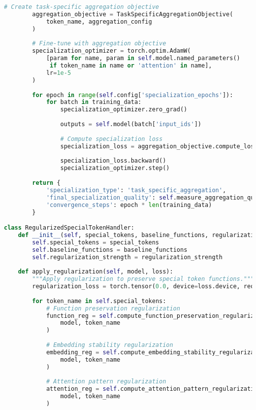 \begin{lstlisting}[language=Python, caption=Function-preserving fine-tuning framework]
        # Create task-specific aggregation objective
        aggregation_objective = TaskSpecificAggregationObjective(
            token_name, aggregation_config
        )
        
        # Fine-tune with aggregation objective
        specialization_optimizer = torch.optim.AdamW(
            [param for name, param in self.model.named_parameters() 
             if token_name in name or 'attention' in name],
            lr=1e-5
        )
        
        for epoch in range(self.config['specialization_epochs']):
            for batch in training_data:
                specialization_optimizer.zero_grad()
                
                outputs = self.model(batch['input_ids'])
                
                # Compute specialization loss
                specialization_loss = aggregation_objective.compute_loss(outputs, batch)
                
                specialization_loss.backward()
                specialization_optimizer.step()
        
        return {
            'specialization_type': 'task_specific_aggregation',
            'final_specialization_quality': self.measure_aggregation_quality(token_name),
            'convergence_steps': epoch * len(training_data)
        }

class RegularizedSpecialTokenHandler:
    def __init__(self, special_tokens, baseline_functions, regularization_strength):
        self.special_tokens = special_tokens
        self.baseline_functions = baseline_functions
        self.regularization_strength = regularization_strength
        
    def apply_regularization(self, model, loss):
        """Apply regularization to preserve special token functions."""
        regularization_loss = torch.tensor(0.0, device=loss.device, requires_grad=True)
        
        for token_name in self.special_tokens:
            # Function preservation regularization
            function_reg = self.compute_function_preservation_regularization(
                model, token_name
            )
            
            # Embedding stability regularization
            embedding_reg = self.compute_embedding_stability_regularization(
                model, token_name
            )
            
            # Attention pattern regularization
            attention_reg = self.compute_attention_pattern_regularization(
                model, token_name
            )
            

\end{lstlisting}
